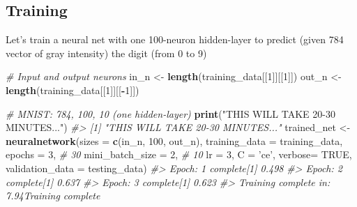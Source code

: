 \documentclass[]{book}
\newenvironment{Shaded}{\begin{snugshade}}{\end{snugshade}}
\newcommand{\CommentTok}[1]{\textcolor[rgb]{0.56,0.35,0.01}{\textit{#1}}}
\newcommand{\DataTypeTok}[1]{\textcolor[rgb]{0.13,0.29,0.53}{#1}}
\newcommand{\DecValTok}[1]{\textcolor[rgb]{0.00,0.00,0.81}{#1}}
\newcommand{\KeywordTok}[1]{\textcolor[rgb]{0.13,0.29,0.53}{\textbf{#1}}}
\newcommand{\NormalTok}[1]{#1}
\newcommand{\OperatorTok}[1]{\textcolor[rgb]{0.81,0.36,0.00}{\textbf{#1}}}
\newcommand{\OtherTok}[1]{\textcolor[rgb]{0.56,0.35,0.01}{#1}}
\newcommand{\StringTok}[1]{\textcolor[rgb]{0.31,0.60,0.02}{#1}}
\begin{document}
\hypertarget{training}{%
\subsection{Training}\label{training}}

Let's train a neural net with one 100-neuron hidden-layer to predict (given 784 vector of gray intensity) the digit (from 0 to 9)

\begin{Shaded}
\begin{Highlighting}[]
\CommentTok{# Input and output neurons}
\NormalTok{in_n <-}\StringTok{ }\KeywordTok{length}\NormalTok{(training_data[[}\DecValTok{1}\NormalTok{]][[}\DecValTok{1}\NormalTok{]])}
\NormalTok{out_n <-}\StringTok{ }\KeywordTok{length}\NormalTok{(training_data[[}\DecValTok{1}\NormalTok{]][[}\OperatorTok{-}\DecValTok{1}\NormalTok{]])}

\CommentTok{# MNIST: 784, 100, 10 (one hidden-layer)}
\KeywordTok{print}\NormalTok{(}\StringTok{"THIS WILL TAKE 20-30 MINUTES..."}\NormalTok{)}
\CommentTok{#> [1] "THIS WILL TAKE 20-30 MINUTES..."}
\NormalTok{trained_net <-}\StringTok{ }\KeywordTok{neuralnetwork}\NormalTok{(}\DataTypeTok{sizes =} \KeywordTok{c}\NormalTok{(in_n, }\DecValTok{100}\NormalTok{, out_n), }
                             \DataTypeTok{training_data =}\NormalTok{ training_data,}
                             \DataTypeTok{epochs =} \DecValTok{3}\NormalTok{,           }\CommentTok{# 30}
                             \DataTypeTok{mini_batch_size =} \DecValTok{2}\NormalTok{,  }\CommentTok{# 10}
                             \DataTypeTok{lr =} \DecValTok{3}\NormalTok{,}
                             \DataTypeTok{C =} \StringTok{'ce'}\NormalTok{,}
                             \DataTypeTok{verbose=}  \OtherTok{TRUE}\NormalTok{,}
                             \DataTypeTok{validation_data =}\NormalTok{ testing_data)}
\CommentTok{#> Epoch:  1  complete[1] 0.498}
\CommentTok{#> Epoch:  2  complete[1] 0.637}
\CommentTok{#> Epoch:  3  complete[1] 0.623}
\CommentTok{#> Training complete in:  7.94Training complete}
\end{Highlighting}
\end{Shaded}
\end{document}
